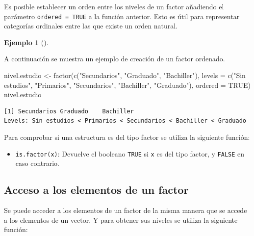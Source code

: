 \documentclass[
  a4paper,
]{scrreport}
\newenvironment{Shaded}{\begin{snugshade}}{\end{snugshade}}
\newcommand{\AttributeTok}[1]{\textcolor[rgb]{0.40,0.45,0.13}{#1}}
\newcommand{\ConstantTok}[1]{\textcolor[rgb]{0.56,0.35,0.01}{#1}}
\newcommand{\FunctionTok}[1]{\textcolor[rgb]{0.28,0.35,0.67}{#1}}
\newcommand{\NormalTok}[1]{\textcolor[rgb]{0.00,0.23,0.31}{#1}}
\newcommand{\OtherTok}[1]{\textcolor[rgb]{0.00,0.23,0.31}{#1}}
\newcommand{\StringTok}[1]{\textcolor[rgb]{0.13,0.47,0.30}{#1}}
\providecommand{\tightlist}{%
  \setlength{\itemsep}{0pt}\setlength{\parskip}{0pt}}\usepackage{longtable,booktabs,array}
\theoremstyle{definition}
\theoremstyle{definition}
\newtheorem{example}{Ejemplo}[chapter]
\theoremstyle{remark}
\begin{document}
Es posible establecer un orden entre los niveles de un factor añadiendo
el parámetro \texttt{ordered\ =\ TRUE} a la función anterior. Esto es
útil para representar categorías ordinales entre las que existe un orden
natural.

\leavevmode{}%
\begin{example}[]\label{exm-creacion-factor-ordenado}

A continuación se muestra un ejemplo de creación de un factor ordenado.

\begin{Shaded}
\begin{Highlighting}[]
\NormalTok{nivel.estudio }\OtherTok{\textless{}{-}} \FunctionTok{factor}\NormalTok{(}\FunctionTok{c}\NormalTok{(}\StringTok{"Secundarios"}\NormalTok{, }\StringTok{"Graduado"}\NormalTok{, }\StringTok{"Bachiller"}\NormalTok{), }\AttributeTok{levels =} \FunctionTok{c}\NormalTok{(}\StringTok{"Sin estudios"}\NormalTok{, }\StringTok{"Primarios"}\NormalTok{, }\StringTok{"Secundarios"}\NormalTok{, }\StringTok{"Bachiller"}\NormalTok{, }\StringTok{"Graduado"}\NormalTok{), }\AttributeTok{ordered =} \ConstantTok{TRUE}\NormalTok{)}
\NormalTok{nivel.estudio}
\end{Highlighting}
\end{Shaded}

\begin{verbatim}
[1] Secundarios Graduado    Bachiller  
Levels: Sin estudios < Primarios < Secundarios < Bachiller < Graduado
\end{verbatim}

\end{example}

Para comprobar si una estructura es del tipo factor se utiliza la
siguiente función:

\begin{itemize}
\tightlist
\item
  \texttt{is.factor(x)}: Devuelve el booleano \texttt{TRUE} si
  \texttt{x} es del tipo factor, y \texttt{FALSE} en caso contrario.
\end{itemize}

\hypertarget{acceso-a-los-elementos-de-un-factor}{%
\subsection{Acceso a los elementos de un
factor}\label{acceso-a-los-elementos-de-un-factor}}

Se puede acceder a los elementos de un factor de la misma manera que se
accede a los elementos de un vector. Y para obtener sus niveles se
utiliza la siguiente función:
\end{document}
